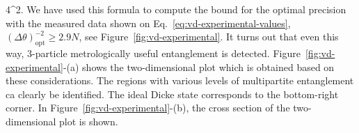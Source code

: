   {4^2}.
  \label{eq:vd-precision-bound-for-second-moments}
\ee
We have used this formula to compute the bound for the optimal precision with the measured data shown on Eq.~\eqref{eq:vd-experimental-values}, $(\Delta \theta)^{-2}_{\text{opt}} \geqslant 2.9N$, see Figure~\ref{fig:vd-experimental}.
It turns out that even this way, 3-particle metrologically useful entanglement is detected.
Figure~\ref{fig:vd-experimental}-(a) shows the two-dimensional plot which is obtained based on these considerations.
The regions with various levels of multipartite entanglement ca clearly be identified.
The ideal Dicke state corresponds to the bottom-right corner.
In Figure~\ref{fig:vd-experimental}-(b), the cross section of the two-dimensional plot is shown.
